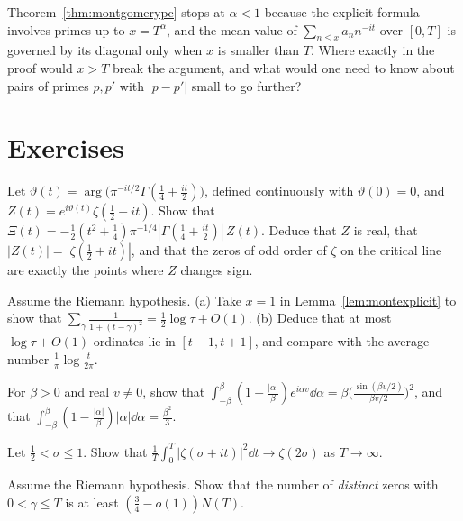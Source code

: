 \begin{think}
Theorem~\ref{thm:montgomerypc} stops at $\alpha<1$ because the explicit formula involves primes up to $x=T^\alpha$, and the mean value of $\sum_{n\le x}a_nn^{-it}$ over $[0,T]$ is governed by its diagonal only when $x$ is smaller than $T$. Where exactly in the proof would $x>T$ break the argument, and what would one need to know about pairs of primes $p,p'$ with $|p-p'|$ small to go further?
\end{think}

\section{Exercises}

\begin{exercise}[$\star$]\label{ex:zreal}
Let $\vartheta(t)=\arg\bigl(\pi^{-it/2}\Gamma(\frac14+\frac{it}2)\bigr)$, defined continuously with $\vartheta(0)=0$, and $Z(t)=e^{i\vartheta(t)}\zeta(\frac12+it)$. Show that $\Xi(t)=-\frac12(t^2+\frac14)\pi^{-1/4}|\Gamma(\frac14+\frac{it}2)|\,Z(t)$. Deduce that $Z$ is real, that $|Z(t)|=|\zeta(\frac12+it)|$, and that the zeros of odd order of $\zeta$ on the critical line are exactly the points where $Z$ changes sign.
\end{exercise}

\begin{exercise}[$\star$]\label{ex:sumgamma}
Assume the Riemann hypothesis. (a) Take $x=1$ in Lemma~\ref{lem:montexplicit} to show that $\sum_\gamma\frac1{1+(t-\gamma)^2}=\frac12\log\tau+O(1)$. (b) Deduce that at most $\log\tau+O(1)$ ordinates lie in $[t-1,t+1]$, and compare with the average number $\frac1\pi\log\frac t{2\pi}$.
\end{exercise}

\begin{exercise}[$\star$]\label{ex:fejervalue}
For $\beta>0$ and real $v\ne0$, show that $\int_{-\beta}^\beta(1-\frac{|\alpha|}\beta)e^{i\alpha v}\dd\alpha=\beta\bigl(\frac{\sin(\beta v/2)}{\beta v/2}\bigr)^2$, and that $\int_{-\beta}^\beta(1-\frac{|\alpha|}\beta)|\alpha|\dd\alpha=\frac{\beta^2}3$.
\end{exercise}

\begin{exercise}[$\star\star$]\label{ex:meansqsigma}
Let $\frac12<\sigma\le1$. Show that $\frac1T\int_0^T|\zeta(\sigma+it)|^2\dd t\to\zeta(2\sigma)$ as $T\to\infty$.
\end{exercise}

\begin{exercise}[$\star\star$]\label{ex:distinctzeros}
Assume the Riemann hypothesis. Show that the number of \emph{distinct} zeros with $0<\gamma\le T$ is at least $(\frac34-o(1))N(T)$.
\end{exercise}

